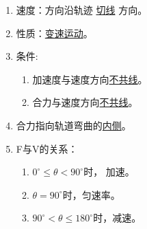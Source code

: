 

\begin{enumerate}
    \item {速度：方向沿轨迹 \uline{切线} 方向。}
    \item {性质：\uline{变速运动}。}
    \item {条件:\begin{enumerate}
    		\item {加速度与速度方向\uline{不共线}。}
    		\item {合力与速度方向\uline{不共线}。}
    \end{enumerate}}
    \item {合力指向轨道弯曲的\uline{内侧}。}
    \item F与V的关系：\begin{enumerate}
    	\item {$0^\circ \leq \theta < 90^\circ$时， 加速。}
    	\item {$\theta = 90^\circ$时，匀速率。}
    	\item {$90^\circ < \theta \leq 180^\circ$时，减速。}
    \end{enumerate}
\end{enumerate}